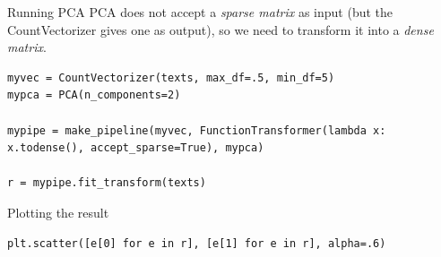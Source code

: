 \documentclass{beamer}
\begin{document}
\begin{frame}{Running PCA}
PCA does not accept a \textit{sparse matrix} as input (but the CountVectorizer gives one as output), so we need to transform it into a \textit{dense matrix}.

\begin{lstlisting}
myvec = CountVectorizer(texts, max_df=.5, min_df=5)
mypca = PCA(n_components=2)

mypipe = make_pipeline(myvec, FunctionTransformer(lambda x: x.todense(), accept_sparse=True), mypca)

r = mypipe.fit_transform(texts)
\end{lstlisting}
\end{frame}



\begin{frame}{Plotting the result}
\begin{lstlisting}
plt.scatter([e[0] for e in r], [e[1] for e in r], alpha=.6)
\end{lstlisting}



\end{frame}
\end{document}
